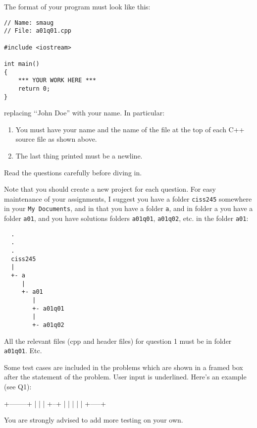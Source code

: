 
The format of your program must look like this:

\begin{Verbatim}[frame=single]
// Name: smaug
// File: a01q01.cpp

#include <iostream>

int main()
{
    *** YOUR WORK HERE ***
    return 0;
}
\end{Verbatim}
replacing \lq\lq John Doe'' with your name.
In particular:
\begin{enumerate}
\item You must have your name and the name of the file at the top of each 
C++ source file as shown above.
\item The last thing printed must be a newline.
\end{enumerate}

Read the questions carefully before diving in.

Note that you should create a new project for each question. 
For easy maintenance of your assignments, 
I suggest you have a folder \verb!ciss245! somewhere in your 
\verb!My Documents!, 
and in that you have a folder 
\verb!a!, 
and in folder a you have a folder 
\verb!a01!, 
and you have solutions folders 
\verb!a01q01!,
\verb!a01q02!, etc. in the folder 
\verb!a01!:


\begin{verbatim}
  .
  .
  .
  ciss245
  |
  +- a
     |
     +- a01
        |
        +- a01q01
        |
        +- a01q02
\end{verbatim}


All the relevant files (cpp and header files) for question 1 
must be in folder \verb!a01q01!. Etc.

Some test cases are included in the problems which are
shown in a framed box after the statement of the problem.
User input is underlined.
Here's an example (see Q1):
\begin{console}[commandchars=\\\{\}]
+--------+
|        |
|  +--+  |
|  |     |
|  +-----+
\end{console}
You are strongly advised to add more testing on your own.
